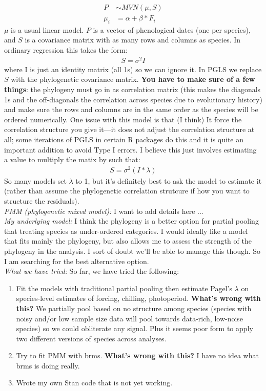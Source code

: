\documentclass[11pt,letter]{article}
\begin{document}
\begin{align}
P & \sim MVN(\mu, S)\\
\mu_i & = \alpha +  \beta*F_i
\end{align}
$\mu$ is a usual linear model. $P$ is a vector of phenological dates (one per species), and $S$ is a covariance matrix with as many rows and columns as species. In ordinary regression this takes the form:
\begin{align}
S = \sigma^2I
\end{align}
where I is just an identity matrix (all 1s) so we can ignore it. In PGLS we replace $S$ with the phylogenetic covariance matrix. {\bf You have to make sure of a few things}: the phylogeny must go in as correlation matrix (this makes the diagonals 1s and the off-diagonals the correlation across species due to evolutionary history) and make sure the rows and columns are in the same order as the species will be ordered numerically. One issue with this model is that (I think) It force the correlation structure you give it---it does not adjust the correlation structure at all; some iterations of PGLS in certain R packages do this and it is quite an important addition to avoid Type I errors. I believe this just involves estimating a value to multiply the matix by such that:
\begin{align}
S = \sigma^2(I*\lambda)
\end{align}
So many models set $\lambda$ to 1, but it's definitely best to ask the model to estimate it (rather than assume the phylogenetic correlation strutcure if how you want to structure the residuals). \\

\emph{PMM (phylogenetic mixed model):} I want to add details here ...\\

\emph{My underlying model:} I think the phylogeny is a better option for partial pooling that treating species as under-ordered categories. I would ideally like a model that fits mainly the phylogeny, but also allows me to assess the strength of the phylogeny in the analysis. I sort of doubt we'll be able to manage this though. So I am searching for the best alternative option. \\

\emph{What we have tried:} So far, we have tried the following:
\begin{enumerate}
\item Fit the models with traditional partial pooling then estimate Pagel's $\lambda$ on species-level estimates of forcing, chilling, photoperiod. {\bf What's wrong with this?} We partially pool based on no structure among species (species with noisy and/or low sample size data will pool towards data-rich, low-noise species) so we could obliterate any signal. Plus it seems poor form to apply two different versions of species across analyses.
\item Try to fit PMM with brms. {\bf What's wrong with this?} I have no idea what brms is doing really.
\item Wrote my own Stan code that is not yet working.  
\end{enumerate}
\end{document}
